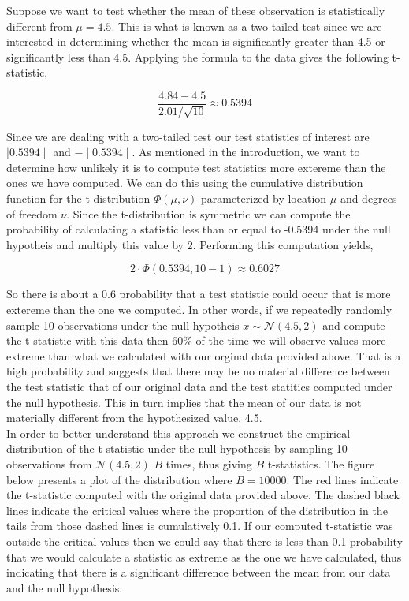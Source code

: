 \documentclass[12pt]{article}
\begin{document}
\noindent Suppose we want to test whether the mean of these observation is statistically different from $\mu = 4.5$. This is what is known as a two-tailed test since we are interested in determining whether the mean is significantly greater than 4.5 or significantly less than 4.5. Applying the formula to the data gives the following t-statistic,

$$
\frac{4.84-4.5}{2.01/\sqrt{10}} \approx 0.5394
$$

\noindent Since we are dealing with a two-tailed test our test statistics of interest are $\mid 0.5394 \mid$ and $-\mid 0.5394 \mid$. As mentioned in the introduction, we want to determine how unlikely it is to compute test statistics more extereme than the ones we have computed. We can do this using the cumulative distribution function for the t-distribution $\Phi(\mu, \nu)$ parameterized by location $\mu$ and degrees of freedom $\nu$. Since the t-distribution is symmetric we can compute the probability of calculating a statistic less than or equal to -0.5394 under the null hypotheis and multiply this value by 2. Performing this computation yields,

$$
2 \cdot \Phi(0.5394, 10-1) \approx 0.6027
$$

\noindent So there is about a 0.6 probability that a test statistic could occur that is more extereme than the one we computed. In other words, if we repeatedly randomly sample 10 observations under the null hypotheis $x \sim \mathcal{N}(4.5, 2)$ and compute the t-statistic with this data then 60\% of the time we will observe values more extreme than what we calculated with our orginal data provided above. That is a high probability and suggests that there may be no material difference between the test statistic that of our original data and the test statitics computed under the null hypothesis. This in turn implies that the mean of our data is not materially different from the hypothesized value, 4.5. \\

\noindent In order to better understand this approach we construct the empirical distribution of the t-statistic under the null hypothesis by sampling 10 observations from $\mathcal{N}(4.5,2)$ $B$ times, thus giving $B$ t-statistics. The figure below presents a plot of the distribution where $B = 10000$. The red lines indicate the t-statistic computed with the original data provided above. The dashed black lines indicate the critical values where the proportion of the distribution in the tails from those dashed lines is cumulatively 0.1. If our computed t-statistic was outside the critical values then we could say that there is less than 0.1 probability that we would calculate a statistic as extreme as the one we have calculated, thus indicating that there is a significant difference between the mean from our data and the null hypothesis. \\
\end{document}
